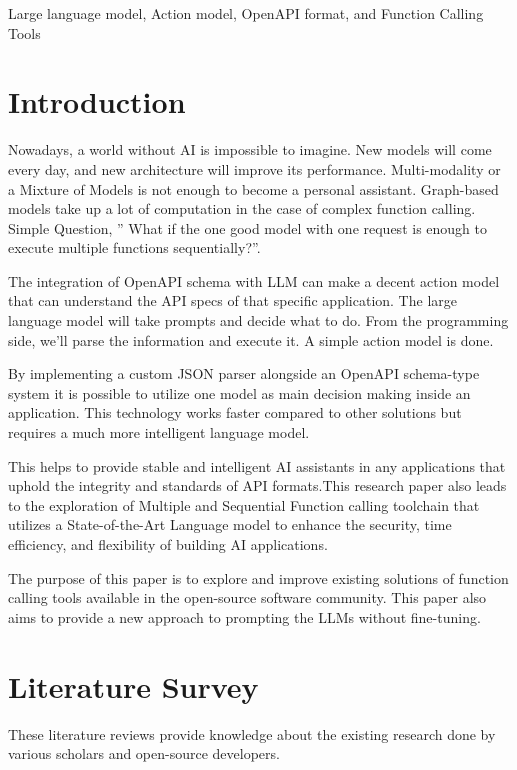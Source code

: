 \documentclass[conference]{IEEEtran}
\begin{document}
\begin{IEEEkeywords}
    Large language model, Action model, OpenAPI format, and Function Calling Tools
\end{IEEEkeywords}

\section{Introduction}
Nowadays, a world without AI is impossible to imagine. New models will come every day, and new architecture will improve its performance. Multi-modality or a Mixture of Models is not enough to become a personal assistant. Graph-based models take up a lot of computation in the case of complex function calling. Simple Question, ” What if the one good model with one request is enough to execute multiple functions sequentially?”.

The integration of OpenAPI schema with LLM can make a decent action model that can understand the API specs of that specific application. The large language model will take prompts and decide what to do. From the programming side, we’ll parse the information and execute it. A simple action model is done.

By implementing a custom JSON parser alongside an OpenAPI schema-type system it is possible to utilize one model as main decision making inside an application. This technology works faster compared to other solutions but requires a much more intelligent language model. 

This helps to provide stable and intelligent AI assistants in any applications that uphold the integrity and standards of API formats.This research paper also leads to the exploration of Multiple and Sequential Function calling toolchain that utilizes a State-of-the-Art Language model to enhance the security, time efficiency, and flexibility of building AI applications. 

The purpose of this paper is to explore and improve existing solutions of function calling tools available in the open-source software community. This paper also aims to provide a new approach to prompting the LLMs without fine-tuning.

\section{Literature Survey}
These literature reviews provide knowledge about the existing research done by various scholars and open-source developers.
\end{document}
